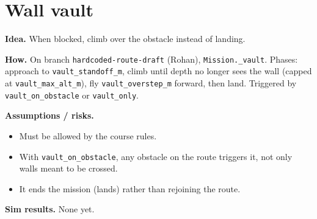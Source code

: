 \section{Wall vault}
\textbf{Idea.} When blocked, climb over the obstacle instead of landing.

\textbf{How.} On branch \texttt{hardcoded-route-draft} (Rohan), \texttt{Mission.\_vault}.
Phases: approach to \texttt{vault\_standoff\_m}, climb until depth no longer sees the wall
(capped at \texttt{vault\_max\_alt\_m}), fly \texttt{vault\_overstep\_m} forward, then land.
Triggered by \texttt{vault\_on\_obstacle} or \texttt{vault\_only}.

\textbf{Assumptions / risks.}
\begin{itemize}
  \item Must be allowed by the course rules.
  \item With \texttt{vault\_on\_obstacle}, any obstacle on the route triggers it, not only walls meant to be crossed.
  \item It ends the mission (lands) rather than rejoining the route.
\end{itemize}

\textbf{Sim results.} None yet.

